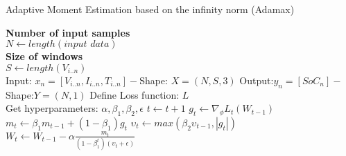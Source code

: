 \begin{algorithm}
  \caption{Adaptive Moment Estimation based on the infinity norm (Adamax)}
  \begin{algorithmic}[1]
    \STATE \textbf{Number of input samples} \\ $N\gets length(\textit{input data})$\\
    \STATE \textbf{Size of windows} \\ $S\gets length(V_{i..n})$\\
    \STATE Input: $x_n = [V_{i..n}, I_{i..n}, T_{i..n}] - $Shape: $X = (N, S, 3)$
    \STATE Output:$y_n = [SoC_{n}] - $Shape:$Y = (N, 1)$
    \STATE Define Loss function: $L$ \\
           Get hyperparameters: $\alpha, \beta_1, \beta_2, \epsilon$
    \STATE $t \gets t+1$
    \STATE $g_t \gets \nabla_\phi L_t (W_{t-1})$ 
    \STATE $m_t \gets \beta_1 m_{t-1}+(1-\beta_1) g_t $ 
    \STATE $\upsilon_t \gets max\left(\beta_2\upsilon_{t-1}, |g_t|\right) $ 
    \STATE $W_t \gets W_{t-1}- \alpha \frac{m_t}{(1-\beta^t_1)(\upsilon_t+\epsilon)} $ 
    \ENDWHILE
  \end{algorithmic}
  \label{alg:adamax}
\end{algorithm}
